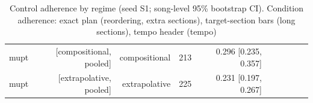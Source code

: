 \begin{table}[t]
\begin{tabular}{lrrrrrrrrrr}
mupt & [compositional, pooled] & compositional & 213 &  & 0.296 [0.235, 0.357] &  &  &  &  &  \\
mupt & [extrapolative, pooled] & extrapolative & 225 &  & 0.231 [0.197, 0.267] &  &  &  &  &  \\
\bottomrule
\end{tabular}
\caption{Control adherence by regime (seed S1; song-level 95\% bootstrap CI). Condition adherence: exact plan (reordering, extra sections), target-section bars (long sections), tempo header (tempo)}
\label{tab:ood_generalization}
\end{table}

